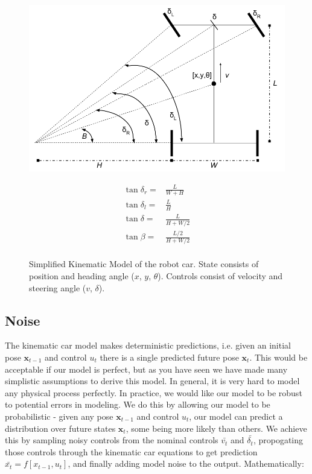 \documentclass[final]{article}
\begin{document}
\begin{figure}[h]
\noindent\begin{minipage}{.75\textwidth}
   \includegraphics[width=1.0\textwidth]{figs/kinematic_car_model.png}
\end{minipage}
\begin{minipage}{.15\textwidth}
\begin{align*}
   \tan{\delta_r} =& \frac{L}{W+H}\\
   \tan{\delta_l} =& \frac{L}{H}\\
   \tan{\delta} =& \frac{L}{H+W/2}\\
   \tan{\beta} =& \frac{L/2}{H+W/2}\\
\end{align*}
\end{minipage}
\caption{Simplified Kinematic Model of the robot car. State consists of position and heading angle ($x$, $y$, $\theta$). Controls consist of velocity and steering angle ($v$, $\delta$).}
\end{figure}

\subsection{Noise}

The kinematic car model makes deterministic predictions, i.e. given an initial pose $\mathbf{x}_{t-1}$ and control $u_t$ there is a single predicted future pose $\mathbf{x}_t$. This would be acceptable if our model is perfect, but as you have seen we have made many simplistic assumptions to derive this model. In general, it is very hard to model any physical process perfectly. In practice, we would like our model to be robust to  potential errors in modeling. We do this by allowing our model to be probabilistic - given any pose $\mathbf{x}_{t-1}$ and control $u_t$, our model can predict a distribution over future states $\mathbf{x}_t$, some being more likely than others. We achieve this by sampling noisy controls from the nominal controls $\bar{v_t}$ and $\bar{\delta_t}$, propogating those controls through the kinematic car equations to get prediction $\bar{x_t} = f[x_{t-1},u_t]$, and finally adding model noise to the output. Mathematically: 
\end{document}
